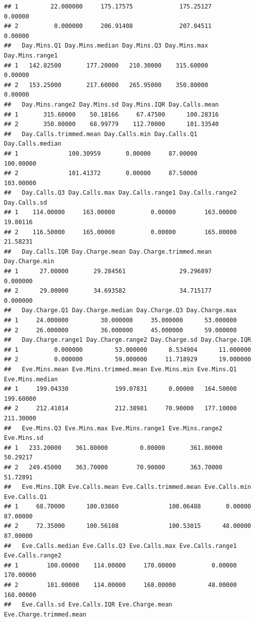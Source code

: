 \documentclass{article}\usepackage[]{graphicx}\usepackage[]{color}
\makeatletter
\newenvironment{kframe}{%
 \def\at@end@of@kframe{}%
 \ifinner\ifhmode%
  \def\at@end@of@kframe{\end{minipage}}%
  \begin{minipage}{\columnwidth}%
 \fi\fi%
 \def\FrameCommand##1{\hskip\@totalleftmargin \hskip-\fboxsep
 \colorbox{shadecolor}{##1}\hskip-\fboxsep
     \hskip-\linewidth \hskip-\@totalleftmargin \hskip\columnwidth}%
 \MakeFramed {\advance\hsize-\width
   \@totalleftmargin\z@ \linewidth\hsize
   \@setminipage}}%
 {\par\unskip\endMakeFramed%
 \at@end@of@kframe}
\newenvironment{knitrout}{}{} %
\makeatother
\begin{document}
\begin{description}
\begin{knitrout}
\begin{kframe}
\begin{verbatim}
## 1         22.000000     175.17575             175.25127      0.00000
## 2          0.000000     206.91408             207.04511      0.00000
##   Day.Mins.Q1 Day.Mins.median Day.Mins.Q3 Day.Mins.max Day.Mins.range1
## 1   142.82500       177.20000   210.30000    315.60000         0.00000
## 2   153.25000       217.60000   265.95000    350.80000         0.00000
##   Day.Mins.range2 Day.Mins.sd Day.Mins.IQR Day.Calls.mean
## 1       315.60000    50.18166     67.47500      100.28316
## 2       350.80000    68.99779    112.70000      101.33540
##   Day.Calls.trimmed.mean Day.Calls.min Day.Calls.Q1 Day.Calls.median
## 1              100.30959       0.00000     87.00000        100.00000
## 2              101.41372       0.00000     87.50000        103.00000
##   Day.Calls.Q3 Day.Calls.max Day.Calls.range1 Day.Calls.range2 Day.Calls.sd
## 1    114.00000     163.00000          0.00000        163.00000     19.80116
## 2    116.50000     165.00000          0.00000        165.00000     21.58231
##   Day.Calls.IQR Day.Charge.mean Day.Charge.trimmed.mean Day.Charge.min
## 1      27.00000       29.284561               29.296897       0.000000
## 2      29.00000       34.693582               34.715177       0.000000
##   Day.Charge.Q1 Day.Charge.median Day.Charge.Q3 Day.Charge.max
## 1     24.000000         30.000000     35.000000      53.000000
## 2     26.000000         36.000000     45.000000      59.000000
##   Day.Charge.range1 Day.Charge.range2 Day.Charge.sd Day.Charge.IQR
## 1          0.000000         53.000000      8.534904      11.000000
## 2          0.000000         59.000000     11.718929      19.000000
##   Eve.Mins.mean Eve.Mins.trimmed.mean Eve.Mins.min Eve.Mins.Q1 Eve.Mins.median
## 1     199.04330             199.07831      0.00000   164.50000       199.60000
## 2     212.41014             212.38981     70.90000   177.10000       211.30000
##   Eve.Mins.Q3 Eve.Mins.max Eve.Mins.range1 Eve.Mins.range2 Eve.Mins.sd
## 1   233.20000    361.80000         0.00000       361.80000    50.29217
## 2   249.45000    363.70000        70.90000       363.70000    51.72891
##   Eve.Mins.IQR Eve.Calls.mean Eve.Calls.trimmed.mean Eve.Calls.min Eve.Calls.Q1
## 1     68.70000      100.03860              100.06488       0.00000     87.00000
## 2     72.35000      100.56108              100.53015      48.00000     87.00000
##   Eve.Calls.median Eve.Calls.Q3 Eve.Calls.max Eve.Calls.range1 Eve.Calls.range2
## 1        100.00000    114.00000     170.00000          0.00000        170.00000
## 2        101.00000    114.00000     168.00000         48.00000        168.00000
##   Eve.Calls.sd Eve.Calls.IQR Eve.Charge.mean Eve.Charge.trimmed.mean

\end{verbatim}
\end{kframe}
\end{knitrout}
\end{description}
\end{document}
